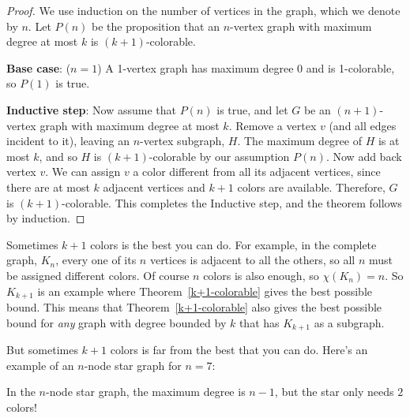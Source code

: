 \begin{proof}
We use induction on the number of vertices in the graph, which we
denote by $n$.  Let $P(n)$ be the proposition that an $n$-vertex graph
with maximum degree at most $k$ is $(k+1)$-colorable.

\textbf{Base case}: ($n=1$) A 1-vertex graph has maximum degree 0 and is
1-colorable, so $P(1)$ is true.

\textbf{Inductive step}: Now assume that $P(n)$ is true, and let $G$ be an
$(n+1)$-vertex graph with maximum degree at most $k$.  Remove a vertex $v$
(and all edges incident to it), leaving an $n$-vertex subgraph, $H$.  The
maximum degree of $H$ is at most $k$, and so $H$ is $(k+1)$-colorable by
our assumption $P(n)$.  Now add back vertex $v$.  We can assign $v$ a
color different from all its adjacent vertices, since there are at
most $k$ adjacent vertices and $k+1$ colors are available.  Therefore, $G$
is $(k+1)$-colorable.  This completes the Inductive step, and the theorem
follows by induction.
\end{proof}


Sometimes $k+1$ colors is the best you can do.  For example, in the
complete graph, $K_{n}$, every one of its $n$ vertices is adjacent to all
the others, so all $n$ must be assigned different colors.  Of course $n$
colors is also enough, so $\chi(K_n)=n$.  So $K_{k+1}$ is an example where
Theorem~\ref{k+1-colorable} gives the best possible bound.  This means
that Theorem~\ref{k+1-colorable} also gives the best possible bound for
\emph{any} graph with degree bounded by $k$ that has $K_{k+1}$ as a
subgraph.

But sometimes $k+1$ colors is far from the best that you can do.  Here's
an example of an $n$-node star graph for $n=7$:


In the $n$-node star graph, the maximum degree is $n-1$, but the star only
needs $2$ colors!


